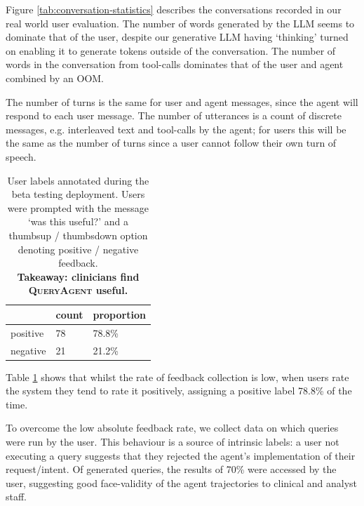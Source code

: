 \documentclass[11pt]{article}
\begin{document}
Figure \ref{tab:conversation-statistics} describes the conversations recorded in our real world user evaluation.
The number of words generated by the LLM seems to dominate that of the user, despite our generative LLM having `thinking' turned on enabling it to generate tokens outside of the conversation.
The number of words in the conversation from tool-calls dominates that of the user and agent combined by an OOM.

The number of turns is the same for user and agent messages, since the agent will respond to each user message.
The number of utterances is a count of discrete messages, e.g. interleaved text and tool-calls by the agent; for users this will be the same as the number of turns since a user cannot follow their own turn of speech.

\begin{table}[ht]
\centering
\begin{tabular}{|l|l|l|}
\hline
	            & count &  proportion \\	
\hline
	positive 	& 78 & 78.8\%	\\
\hline
	negative 	& 21 & 21.2\%\\
\hline
\end{tabular}
\caption{
	User labels annotated during the beta testing deployment.
	Users were prompted with the message `was this useful?' and a thumbsup / thumbsdown option denoting positive / negative feedback.\\
	\textbf{Takeaway: clinicians find \textsc{QueryAgent} useful.}
}
\label{tab:user-feedback}
\end{table}


Table \ref{tab:user-feedback} shows that whilst the rate of feedback collection is low, when users rate the system they tend to rate it positively, assigning a positive label 78.8\% of the time.

To overcome the low absolute feedback rate, we collect data on which queries were run by the user.
This behaviour is a source of intrinsic labels: a user not executing a query suggests that they rejected the agent's implementation of their request/intent.
Of generated queries, the results of 70\% were accessed by the user, suggesting good face-validity of the agent trajectories to clinical and analyst staff.
\end{document}
